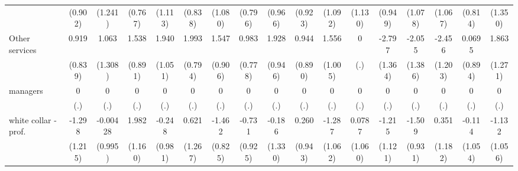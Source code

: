 {\begin{tabular}{l*{16}{c}}
                    &     (0.902)         &     (1.241)         &     (0.767)         &     (1.113)         &     (0.838)         &     (1.080)         &     (0.796)         &     (0.966)         &     (0.923)         &     (1.092)         &     (1.130)         &     (0.949)         &     (1.078)         &     (1.067)         &     (0.814)         &     (1.350)         \\
[1em]
Other services      &       0.919         &       1.063         &       1.538         &       1.940         &       1.993\sym{*}  &       1.547         &       0.983         &       1.928\sym{*}  &       0.944         &       1.556         &           0         &      -2.797\sym{*}  &      -2.055         &      -2.456\sym{*}  &      0.0695         &       1.863         \\
                    &     (0.839)         &     (1.308)         &     (0.891)         &     (1.051)         &     (0.794)         &     (0.906)         &     (0.778)         &     (0.946)         &     (0.890)         &     (1.005)         &         (.)         &     (1.364)         &     (1.386)         &     (1.203)         &     (0.894)         &     (1.271)         \\
[1em]
managers            &           0         &           0         &           0         &           0         &           0         &           0         &           0         &           0         &           0         &           0         &           0         &           0         &           0         &           0         &           0         &           0         \\
                    &         (.)         &         (.)         &         (.)         &         (.)         &         (.)         &         (.)         &         (.)         &         (.)         &         (.)         &         (.)         &         (.)         &         (.)         &         (.)         &         (.)         &         (.)         &         (.)         \\
[1em]
white collar - prof.&      -1.298         &    -0.00428         &       1.982         &      -0.248         &       0.621         &      -1.462         &      -0.731         &      -0.186         &       0.260         &      -1.287         &      0.0787         &      -1.215         &      -1.509         &       0.351         &      -0.114         &      -1.132         \\
                    &     (1.215)         &     (0.995)         &     (1.160)         &     (0.981)         &     (1.267)         &     (0.825)         &     (0.925)         &     (1.330)         &     (0.943)         &     (1.062)         &     (1.060)         &     (1.121)         &     (0.931)         &     (1.182)         &     (1.054)         &     (1.056)         \\

\end{tabular}}
